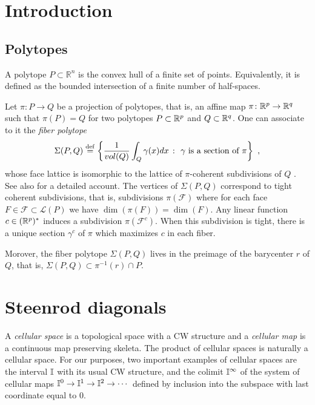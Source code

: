 
\section{Introduction} \label{s:introduction}

\subsection{Polytopes}

A polytope $P \subset \mathbb{R}^n$ is the convex hull of a finite set of points. Equivalently, it is defined as the bounded intersection of a finite number of half-spaces.

Let $\pi \colon P \to Q$ be a projection of polytopes, that is, an affine map $\pi \colon \mathbb{R}^p \to \mathbb{R}^q$ such that $\pi(P)=Q$ for two polytopes $P\subset \mathbb{R}^p$ and $Q \subset \mathbb{R}^q$.
One can associate to it the \emph{fiber polytope} \[\Sigma(P,Q) \stackrel{\mathrm{def}}{=} \left\{ \frac{1}{vol(Q)}\int_Q \gamma(x)dx \ \colon \ \gamma \text{ is a section of }\pi \right\} \ , \] whose face lattice is isomorphic to the lattice of $\pi$-coherent subdivisions of $Q$ \cite{BilleraSturmfels92}.
See also \cite[Chapter 9]{Ziegler95} for a detailed account.
The vertices of $\Sigma(P,Q)$ correspond to tight coherent subdivisions, that is, subdivisions $\pi(\mathcal{F})$ where for each face $F \in \mathcal{F}\subset\mathcal{L}(P)$ we have $\dim(\pi(F))=\dim(F)$.
Any linear function $c\in (\mathbb{R}^p)^{*}$ induces a subdivision $\pi(\mathcal{F}^c)$.
When this subdivision is tight, there is a unique section $\gamma^c$ of $\pi$ which maximizes $c$ in each fiber.

Morover, the fiber polytope $\Sigma(P,Q)$ lives in the preimage of the barycenter $r$ of $Q$, that is, $\Sigma(P,Q)\subset\pi^{-1}(r)\cap P$.

\section{Steenrod diagonals}

A \textit{cellular space} is a topological space with a CW structure and a \textit{cellular map} is a continuous map preserving skeleta.
The product of cellular spaces is naturally a cellular space.
For our purposes, two important examples of cellular spaces are the interval $\mathbb{I}$ with its usual CW structure, and the colimit $\mathbb{I}^\infty$ of the system of cellular maps $\mathbb{I}^0 \to \mathbb{I}^1 \to \mathbb{I}^2 \to \dotsb$ defined by inclusion into the subspace with last coordinate equal to $0$.

